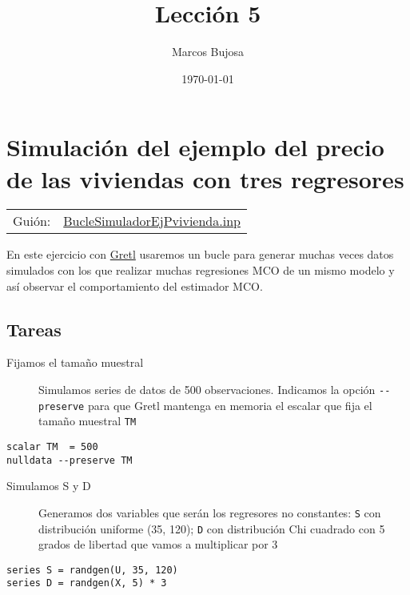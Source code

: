 \documentclass[11pt]{article}
\author{Marcos Bujosa}
\date{\today}
\title{Lección 5}
\begin{document}
\maketitle
\tableofcontents

\clearpage

\section{Simulación del ejemplo del precio de las viviendas con tres regresores}
\label{sec:org382e5c7}

\begin{center}
\begin{tabular}{ll}
Guión: & \href{https://github.com/mbujosab/Ectr/tree/master/Practicas/Gretl/scripts/BucleSimuladorEjPvivienda.inp}{BucleSimuladorEjPvivienda.inp}\\[0pt]
\end{tabular}
\end{center}

En este ejercicio con \href{https://gretl.sourceforge.net/es.html}{Gretl} usaremos un bucle para generar muchas
veces datos simulados con los que realizar muchas regresiones MCO de
un mismo modelo y así observar el comportamiento del estimador MCO.

\subsection{Tareas}
\label{sec:org98f3006}

\begin{description}
\item[{Fijamos el tamaño muestral}] Simulamos series de datos de 500
observaciones. Indicamos la opción \texttt{-{}-preserve} para que Gretl
mantenga en memoria el escalar que fija el tamaño muestral \texttt{TM}
\end{description}
\begin{verbatim}
scalar TM  = 500
nulldata --preserve TM
\end{verbatim}

\begin{description}
\item[{Simulamos S y D}] Generamos dos variables que serán los regresores
no constantes: \texttt{S} con distribución uniforme (35, 120); \texttt{D} con
distribución Chi cuadrado con 5 grados de libertad que vamos a
multiplicar por 3
\end{description}
\begin{verbatim}
series S = randgen(U, 35, 120)
series D = randgen(X, 5) * 3
\end{verbatim}
\end{document}
